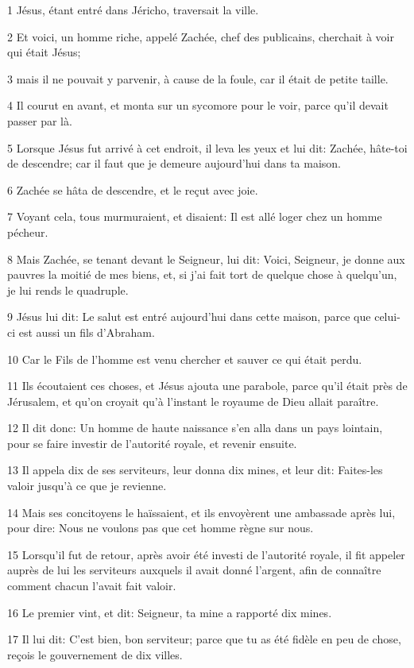 \par 1 Jésus, étant entré dans Jéricho, traversait la ville.
\par 2 Et voici, un homme riche, appelé Zachée, chef des publicains, cherchait à voir qui était Jésus;
\par 3 mais il ne pouvait y parvenir, à cause de la foule, car il était de petite taille.
\par 4 Il courut en avant, et monta sur un sycomore pour le voir, parce qu'il devait passer par là.
\par 5 Lorsque Jésus fut arrivé à cet endroit, il leva les yeux et lui dit: Zachée, hâte-toi de descendre; car il faut que je demeure aujourd'hui dans ta maison.
\par 6 Zachée se hâta de descendre, et le reçut avec joie.
\par 7 Voyant cela, tous murmuraient, et disaient: Il est allé loger chez un homme pécheur.
\par 8 Mais Zachée, se tenant devant le Seigneur, lui dit: Voici, Seigneur, je donne aux pauvres la moitié de mes biens, et, si j'ai fait tort de quelque chose à quelqu'un, je lui rends le quadruple.
\par 9 Jésus lui dit: Le salut est entré aujourd'hui dans cette maison, parce que celui-ci est aussi un fils d'Abraham.
\par 10 Car le Fils de l'homme est venu chercher et sauver ce qui était perdu.
\par 11 Ils écoutaient ces choses, et Jésus ajouta une parabole, parce qu'il était près de Jérusalem, et qu'on croyait qu'à l'instant le royaume de Dieu allait paraître.
\par 12 Il dit donc: Un homme de haute naissance s'en alla dans un pays lointain, pour se faire investir de l'autorité royale, et revenir ensuite.
\par 13 Il appela dix de ses serviteurs, leur donna dix mines, et leur dit: Faites-les valoir jusqu'à ce que je revienne.
\par 14 Mais ses concitoyens le haïssaient, et ils envoyèrent une ambassade après lui, pour dire: Nous ne voulons pas que cet homme règne sur nous.
\par 15 Lorsqu'il fut de retour, après avoir été investi de l'autorité royale, il fit appeler auprès de lui les serviteurs auxquels il avait donné l'argent, afin de connaître comment chacun l'avait fait valoir.
\par 16 Le premier vint, et dit: Seigneur, ta mine a rapporté dix mines.
\par 17 Il lui dit: C'est bien, bon serviteur; parce que tu as été fidèle en peu de chose, reçois le gouvernement de dix villes.
